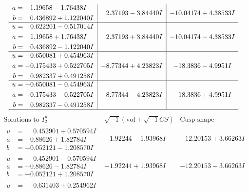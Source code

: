 \documentclass[1p]{elsarticle_modified}
\theoremstyle{definition}
\newcommand{\I}{\sqrt{-1}}
\begin{document}
$$\begin{array}{c|c|c}
\begin{aligned}
a &= \phantom{-}1.19658 - 1.76438 I \\
b &= \phantom{-}0.436892 + 1.122040 I\end{aligned}
 & \phantom{-}2.37193 - 3.84440 I & -10.04174 + 4.38533 I \\ \hline\begin{aligned}
u &= \phantom{-}0.622201 - 0.517014 I \\
a &= \phantom{-}1.19658 + 1.76438 I \\
b &= \phantom{-}0.436892 - 1.122040 I\end{aligned}
 & \phantom{-}2.37193 + 3.84440 I & -10.04174 - 4.38533 I \\ \hline\begin{aligned}
u &= -0.650081 + 0.454963 I \\
a &= -0.175433 + 0.522705 I \\
b &= \phantom{-}0.982337 + 0.491258 I\end{aligned}
 & -8.77344 + 4.23823 I & -18.3836 - 4.9951 I \\ \hline\begin{aligned}
u &= -0.650081 - 0.454963 I \\
a &= -0.175433 - 0.522705 I \\
b &= \phantom{-}0.982337 - 0.491258 I\end{aligned}
 & -8.77344 - 4.23823 I & -18.3836 + 4.9951 I\\
 \hline 
 \end{array}$$\newpage$$\begin{array}{c|c|c}  
\text{Solutions to }I^u_{2}& \I (\text{vol} + \sqrt{-1}CS) & \text{Cusp shape}\\
 \hline 
\begin{aligned}
u &= \phantom{-}0.452901 + 0.570594 I \\
a &= -0.88626 + 1.82784 I \\
b &= -0.052121 - 1.208570 I\end{aligned}
 & -1.92244 - 1.93968 I & -12.20153 + 3.66263 I \\ \hline\begin{aligned}
u &= \phantom{-}0.452901 - 0.570594 I \\
a &= -0.88626 - 1.82784 I \\
b &= -0.052121 + 1.208570 I\end{aligned}
 & -1.92244 + 1.93968 I & -12.20153 - 3.66263 I \\ \hline\begin{aligned}
u &= \phantom{-}0.631403 + 0.254962 I \\

\end{aligned}
\end{array}$$
\end{document}

